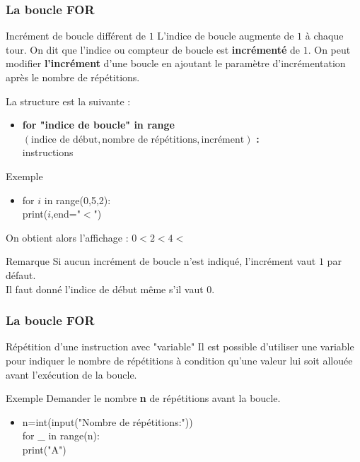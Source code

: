 \documentclass[8pt]{beamer}
\begin{document}
\begin{frame}
\frametitle{La boucle FOR}

\begin{block}{Incrément de boucle différent de $1$}
L'indice de boucle augmente de $1$ à chaque tour. On dit que l'indice ou compteur de boucle est \textbf{incrémenté} de $1$. On peut modifier \textbf{l'incrément} d'une boucle en ajoutant le paramètre d'incrémentation après le nombre de répétitions.

La structure est la suivante :
\begin{itemize}
\item \textbf{for "indice de boucle" in range}$(\text{indice de début},\text{nombre de répétitions},\text{incrément})$ \textbf{:}\\
\hspace{0.5cm} instructions\\
\end{itemize}
\end{block}

\begin{exampleblock}{Exemple}
\begin{itemize}
\item for $i$ in range(0,5,2):\\
\hspace{0.5cm}print($i$,end="$<$")
\end{itemize}
On obtient alors l'affichage : $0<2<4<$
\end{exampleblock}

\begin{alertblock}{Remarque}
Si aucun incrément de boucle n'est indiqué, l'incrément vaut $1$ par défaut.\\
Il faut donné l'indice de début même s'il vaut $0$.
\end{alertblock}

\end{frame}



\begin{frame}
\frametitle{La boucle FOR}

\begin{block}{Répétition d'une instruction avec "variable"}
Il est possible d'utiliser une variable pour indiquer le nombre de répétitions à condition qu'une valeur lui soit allouée avant l'exécution de la boucle.
\end{block}

\begin{exampleblock}{Exemple}
Demander le nombre \textbf{n} de répétitions avant la boucle.
\begin{itemize}
\item n=int(input("Nombre de répétitions:"))\\
for \_ in range(n):\\
\hspace{0.5cm}print("A")
\end{itemize}
\end{exampleblock}

\end{frame}
\end{document}
